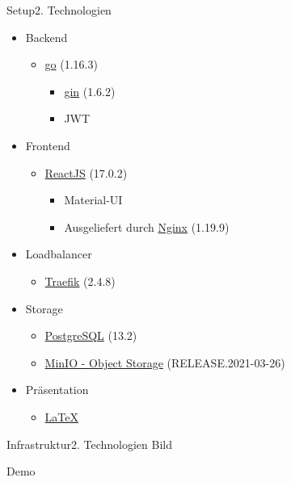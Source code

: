 \documentclass[aspectratio=169,20pt]{beamer}
\begin{document}
\begin{frame}{Setup}{2. Technologien}
	\begin{itemize}
		\item{Backend}
		\begin{itemize}
			\item{\href{https://golang.org/}{go} (1.16.3)}
			\begin{itemize}
				\item{\href{https://gin-gonic.com/}{gin} (1.6.2)}
				\item{JWT}
			\end{itemize}
		\end{itemize}
		\item{Frontend}
		\begin{itemize}
			\item{\href{https://reactjs.org/versions/}{ReactJS} (17.0.2)}
			\begin{itemize}
				\item{Material-UI}
                \item{Ausgeliefert durch \href{https://nginx.org/}{Nginx} (1.19.9)}
			\end{itemize}
		\end{itemize}
        \item{Loadbalancer}
       
		\begin{itemize}
			\item{\href{https://traefik.io/}{Traefik} (2.4.8)}
		\end{itemize} 
		\item{Storage}
		\begin{itemize}
			\item{\href{https://www.postgresql.org/}{PostgreSQL} (13.2)}
            \item{\href{https://min.io/}{MinIO - Object Storage} (RELEASE.2021-03-26)}
		\end{itemize}
		\item{Präsentation}
		\begin{itemize}
			\item{\href{https://github.com/ost-fh/Latex-Beamer-Theme}{LaTeX}}
		\end{itemize}       
	\end{itemize}
	
\end{frame}




\begin{frame}{Infrastruktur}{2. Technologien}
	Bild	
\end{frame}

\begin{frame}{Demo}{}	
\end{frame}
\end{document}
